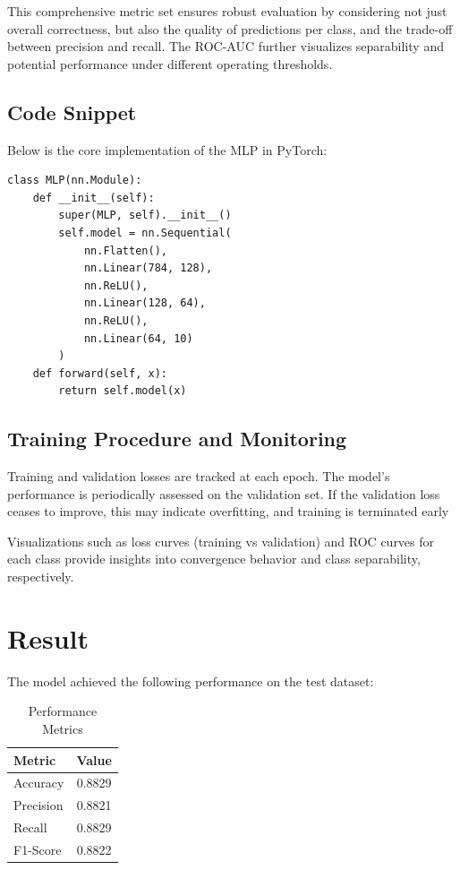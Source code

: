 \documentclass[a4paper, journal]{IEEEtran}
\begin{document}
This comprehensive metric set ensures robust evaluation by considering not just overall correctness, but also the quality of predictions per class, and the trade-off between precision and recall. The ROC-AUC further visualizes separability and potential performance under different operating thresholds.

\subsection{Code Snippet}
Below is the core implementation of the MLP in PyTorch:

\begin{lstlisting}[caption={Model Definition}]
class MLP(nn.Module):
    def __init__(self):
        super(MLP, self).__init__()
        self.model = nn.Sequential(
            nn.Flatten(),
            nn.Linear(784, 128),
            nn.ReLU(),
            nn.Linear(128, 64),
            nn.ReLU(),
            nn.Linear(64, 10)
        )
    def forward(self, x):
        return self.model(x)
\end{lstlisting}

\subsection{Training Procedure and Monitoring}
Training and validation losses are tracked at each epoch. The model's performance is periodically assessed on the validation set. If the validation loss ceases to improve, this may indicate overfitting, and training is terminated early

Visualizations such as loss curves (training vs validation) and ROC curves for each class provide insights into convergence behavior and class separability, respectively.


\section{Result}
The model achieved the following performance on the test dataset:

\begin{table}[h]
    \centering
    \caption{Performance Metrics}
    \begin{tabular}{lc}
        \toprule
        Metric    & Value  \\
        \midrule
        Accuracy  & 0.8829 \\
        Precision & 0.8821 \\
        Recall    & 0.8829 \\
        F1-Score  & 0.8822 \\
        \bottomrule
    \end{tabular}
\end{table}
\end{document}
